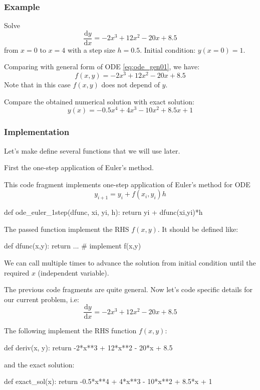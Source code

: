 \begin{frame}
\frametitle{Example}
Solve
\begin{equation*}
\frac{\mathrm{d}y}{\mathrm{d}x} = -2x^3 + 12x^2 - 20x + 8.5
\end{equation*}
from $x = 0$ to $x = 4$ with a step size $h=0.5$.
Initial condition: $y(x=0) = 1$.

Comparing with general form of ODE \eqref{eq:ode_gen01}, we have:
\begin{equation*}
f(x,y) = -2x^3 + 12x^2 - 20x + 8.5
\end{equation*}
Note that in this case $f(x,y)$ does not depend of $y$.

Compare the obtained numerical solution with exact solution:
\begin{equation*}
y(x) = -0.5x^4 + 4x^3 - 10x^2 + 8.5x + 1
\end{equation*}

\end{frame}


\begin{frame}[fragile]
\frametitle{Implementation}

Let's make define several functions that we will use later.

First the one-step application of Euler's method.

This code fragment implements one-step application of Euler's method for ODE
\begin{equation*}
y_{i+1} = y_{i} + f(x_i, y_i) h
\end{equation*}

\begin{pythoncode}
def ode_euler_1step(dfunc, xi, yi, h):
    return yi + dfunc(xi,yi)*h
\end{pythoncode}

The passed function  implement the RHS $f(x,y)$. It should be defined like:
\begin{pythoncode}
def dfunc(x,y):
    return ... # implement f(x,y)
\end{pythoncode}

We can call  multiple times to advance the solution from initial
condition until the required $x$ (independent variable).

\end{frame}


\begin{frame}[fragile]
The previous code fragments are quite general. Now let's code specific
details for our current problem, i.e:
\begin{equation*}
\frac{\mathrm{d}y}{\mathrm{d}x} = -2x^3 + 12x^2 - 20x + 8.5
\end{equation*}

The following implement the RHS function $f(x,y)$:
\begin{pythoncode}
def deriv(x, y):
    return -2*x**3 + 12*x**2 - 20*x + 8.5
\end{pythoncode}
and the exact solution:
\begin{pythoncode}
def exact_sol(x):
    return -0.5*x**4 + 4*x**3 - 10*x**2 + 8.5*x + 1
\end{pythoncode}
\end{frame}


